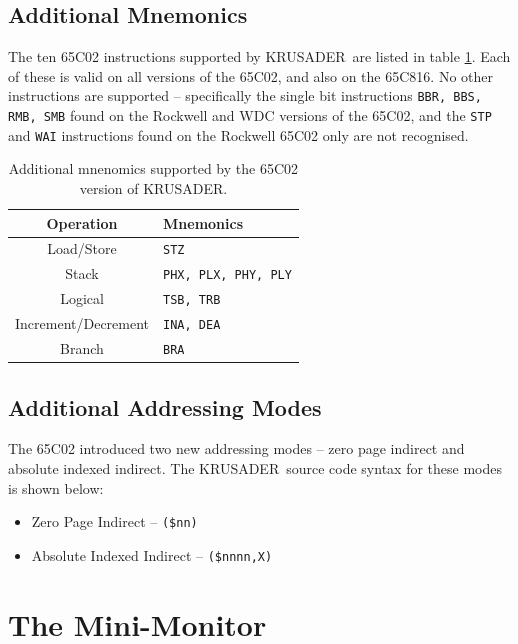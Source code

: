 \documentclass[12pt]{article}
\newcommand{\krusader}{\textsf{KRUSADER}}
\begin{document}
\subsection{Additional Mnemonics}

The ten 65C02 instructions supported by \krusader\ are listed in table \ref{tab:65C02mnemonics}.
Each of these is valid on all versions of the 65C02, and also on the 65C816.  No other
instructions are supported -- specifically the single bit instructions \texttt{BBR, BBS, RMB, SMB}
found on the Rockwell and WDC versions of the 65C02, and the \texttt{STP} and \texttt{WAI} instructions
found on the Rockwell 65C02 only are not recognised.

\begin{table}[htb]
	\centering
	\begin{tabular}{|c|l|} \hline
	\textbf{Operation} & \textbf{Mnemonics} \tabularnewline
	\hline
	Load/Store & \texttt{STZ} \tabularnewline\hline
	Stack & \texttt{PHX, PLX, PHY, PLY} \tabularnewline\hline
	Logical & \texttt{TSB, TRB} \tabularnewline\hline
	Increment/Decrement & \texttt{INA, DEA} \tabularnewline\hline
	Branch & \texttt{BRA} \tabularnewline
	\hline
	\end{tabular}
	\caption{Additional mnenomics supported by the 65C02 version of \krusader.}
	\label{tab:65C02mnemonics}
\end{table}

\subsection{Additional Addressing Modes}

The 65C02 introduced two new addressing modes -- zero page indirect and
absolute indexed indirect.  The \krusader\ source code syntax for these modes is 
shown below:

\begin{itemize}
	\item Zero Page Indirect -- \texttt{(\$nn)}
	\item Absolute Indexed Indirect -- \texttt{(\$nnnn,X)}
\end{itemize}

\section{The Mini-Monitor}
\label{sec:minimon}
\end{document}
